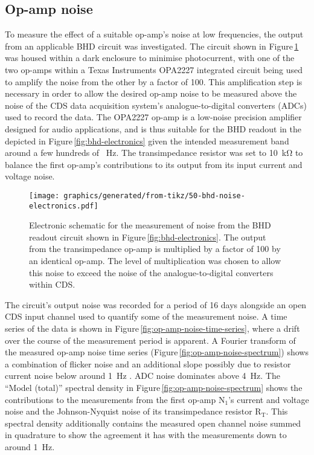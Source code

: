 \subsection{\label{sec:op-amp-noise}Op-amp noise}
To measure the effect of a suitable op-amp's noise at low frequencies, the output from an applicable \gls{BHD} circuit was investigated. The circuit shown in Figure\,\ref{fig:bhd-noise-electronics} was housed within a dark enclosure to minimise photocurrent, with one of the two op-amps within a Texas Instruments\textsuperscript{\textregistered} OPA2227 integrated circuit being used to amplify the noise from the other by a factor of \SI{100}{}. This amplification step is necessary in order to allow the desired op-amp noise to be measured above the noise of the \gls{CDS} data acquisition system's analogue-to-digital converters (\glspl{ADC}) used to record the data. The OPA2227 op-amp is a low-noise precision amplifier designed for audio applications, and is thus suitable for the \gls{BHD} readout in the \SSMEXPT{} depicted in Figure\,\ref{fig:bhd-electronics} given the intended measurement band around a few hundreds of \SI{}{\hertz}. The transimpedance resistor was set to \SI{10}{\kilo\ohm} to balance the first op-amp's contributions to its output from its input current and voltage noise.

\begin{figure}
  \centering
  \texttt{[image: graphics/generated/from-tikz/50-bhd-noise-electronics.pdf]}
  \caption[Electronic schematic for the measurement of noise from the balanced homodyne readout]{\label{fig:bhd-noise-electronics}Electronic schematic for the measurement of noise from the BHD readout circuit shown in Figure\,\ref{fig:bhd-electronics}. The output from the transimpedance op-amp is multiplied by a factor of \num{100} by an identical op-amp. The level of multiplication was chosen to allow this noise to exceed the noise of the analogue-to-digital converters within \gls{CDS}.}
\end{figure}

The circuit's output noise was recorded for a period of \SI{16}{} days alongside an open \gls{CDS} input channel used to quantify some of the measurement noise. A time series of the data is shown in Figure\,\ref{fig:op-amp-noise-time-series}, where a drift over the course of the measurement period is apparent. A Fourier transform of the measured op-amp noise time series (Figure\,\ref{fig:op-amp-noise-spectrum}) shows a combination of flicker noise and an additional slope possibly due to resistor current noise below around \SI{1}{\hertz} \cite{Seifert2009}. \gls{ADC} noise dominates above \SI{4}{\hertz}. The ``Model (total)'' spectral density in Figure\,\ref{fig:op-amp-noise-spectrum} shows the contributions to the measurements from the first op-amp $\textrm{N}_{1}$'s current and voltage noise and the Johnson-Nyquist noise of its transimpedance resistor $\textrm{R}_{\textrm{T}}$. This spectral density additionally contains the measured open channel noise summed in quadrature to show the agreement it has with the measurements down to around \SI{1}{\hertz}.

